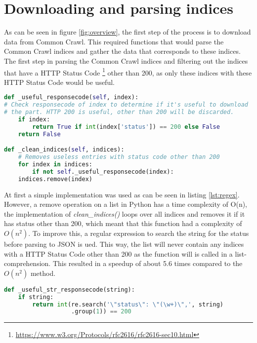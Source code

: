 \section{Downloading and parsing indices}

As can be seen in figure \ref{fig:overview}, the first step of the process is to download data from Common Crawl. This required functions that would parse the Common Crawl indices and gather the data that corresponds to these indices. The first step in parsing the Common Crawl indices and filtering out the indices that have a HTTP Status Code \footnote{\url{https://www.w3.org/Protocols/rfc2616/rfc2616-sec10.html}} other than 200, as only these indices with these HTTP Status Code would be useful. 

\begin{lstlisting}[language=Python, caption=Initial implementation]
def _useful_responsecode(self, index):
# Check responsecode of index to determine if it's useful to download
# the part. HTTP 200 is useful, other than 200 will be discarded.
    if index:
        return True if int(index['status']) == 200 else False
    return False

def _clean_indices(self, indices):
    # Removes useless entries with status code other than 200
    for index in indices:
        if not self._useful_responsecode(index):
    indices.remove(index)
\end{lstlisting}

At first a simple implementation was used as can be seen in listing \ref{lst:regex}. However, a remove operation on a list in Python has a time complexity of O(n), the implementation of \textit{clean\_indices()} loops over all indices and removes it if it has status other than 200, which meant that this function had a complexity of $O(n^2)$. To improve this, a regular expression to search the string for the status before parsing to JSON is ued. This way, the list will never contain any indices with a HTTP Status Code other than 200 as the function will is called in a list-comprehension. This resulted in a speedup of about 5.6 times compared to the $O(n^2)$ method.



\begin{lstlisting}[language=Python, caption=Regex solution]
def _useful_str_responsecode(string):
    if string:
        return int(re.search('\"status\": \"(\w+)\",', string)
                   .group(1)) == 200
\end{lstlisting}

